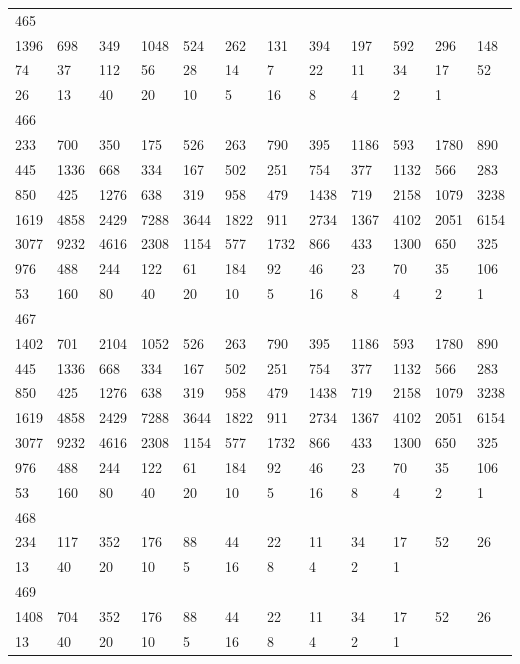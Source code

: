 \begin{longtable}{llllllllllll}
465&&&&&&&&&&&\\
1396& 698& 349& 1048& 524& 262& 131& 394& 197& 592& 296& 148\\
74& 37& 112& 56& 28& 14& 7& 22& 11& 34& 17& 52\\
26& 13& 40& 20& 10& 5& 16& 8& 4& 2& 1& \\

466&&&&&&&&&&&\\
233& 700& 350& 175& 526& 263& 790& 395& 1186& 593& 1780& 890\\
445& 1336& 668& 334& 167& 502& 251& 754& 377& 1132& 566& 283\\
850& 425& 1276& 638& 319& 958& 479& 1438& 719& 2158& 1079& 3238\\
1619& 4858& 2429& 7288& 3644& 1822& 911& 2734& 1367& 4102& 2051& 6154\\
3077& 9232& 4616& 2308& 1154& 577& 1732& 866& 433& 1300& 650& 325\\
976& 488& 244& 122& 61& 184& 92& 46& 23& 70& 35& 106\\
53& 160& 80& 40& 20& 10& 5& 16& 8& 4& 2& 1\\

467&&&&&&&&&&&\\
1402& 701& 2104& 1052& 526& 263& 790& 395& 1186& 593& 1780& 890\\
445& 1336& 668& 334& 167& 502& 251& 754& 377& 1132& 566& 283\\
850& 425& 1276& 638& 319& 958& 479& 1438& 719& 2158& 1079& 3238\\
1619& 4858& 2429& 7288& 3644& 1822& 911& 2734& 1367& 4102& 2051& 6154\\
3077& 9232& 4616& 2308& 1154& 577& 1732& 866& 433& 1300& 650& 325\\
976& 488& 244& 122& 61& 184& 92& 46& 23& 70& 35& 106\\
53& 160& 80& 40& 20& 10& 5& 16& 8& 4& 2& 1\\

468&&&&&&&&&&&\\
234& 117& 352& 176& 88& 44& 22& 11& 34& 17& 52& 26\\
13& 40& 20& 10& 5& 16& 8& 4& 2& 1& \\

469&&&&&&&&&&&\\
1408& 704& 352& 176& 88& 44& 22& 11& 34& 17& 52& 26\\
13& 40& 20& 10& 5& 16& 8& 4& 2& 1& \\


\end{longtable}
